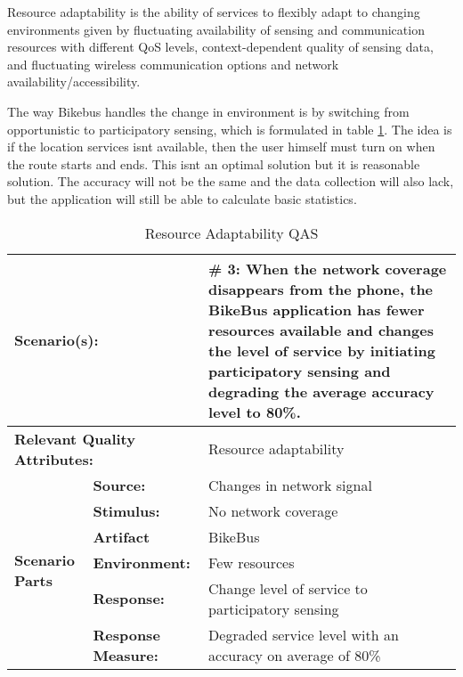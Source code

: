 \begin{defi}
Resource adaptability is the ability of services to flexibly adapt to changing environments given by fluctuating availability of sensing and communication resources with different QoS levels, context-dependent quality of sensing data, and fluctuating wireless communication options and network availability/accessibility.  
  \label{def:resource_adaptability}
\end{defi}

The way Bikebus handles the change in environment is by switching from opportunistic to participatory sensing, which is formulated in table  \ref{table:resource_adaptability_qas}. The idea is if the location services isnt available, then the user himself must turn on when the route starts and ends. This isnt an optimal solution but it is reasonable solution. The accuracy will not be the same and the data collection will also lack, but the application will still be able to calculate basic statistics.    

\begin{table}[H]
\begin{center}
\begin{tabular}{|p{0.3cm}|p{2.5cm}|p{8cm}|}
  \hline
  \multicolumn{2}{|p{3cm}|}{\bfseries Scenario(s):} & \#  3: When the network coverage disappears from the phone, the BikeBus application has fewer resources available and changes the level of service by initiating participatory sensing and degrading the average accuracy level to 80\%. \\
  \hline
  \multicolumn{2}{|p{3cm}|}{\bfseries Relevant Quality Attributes:} & Resource adaptability\\
  \hline
  \multirow{6}{*}{\begin{sideways}{\bfseries Scenario Parts}\end{sideways}}
  & {\bfseries Source:} & Changes in network signal \\
  \cline{2-3}
  & {\bfseries Stimulus:} & No network coverage  \\
  \cline{2-3}
  & {\bfseries Artifact} &  BikeBus \\
  \cline{2-3}
  & {\bfseries Environment:} &  Few resources \\
  \cline{2-3}
  & {\bfseries Response:} &  Change level of service to participatory sensing\\
  \cline{2-3}
  & {\bfseries Response Measure:} & Degraded service level with an accuracy on average of 80\%\\
  \hline
\end{tabular}
\caption{Resource Adaptability QAS}
\label{table:resource_adaptability_qas}
\end{center}
\end{table}



